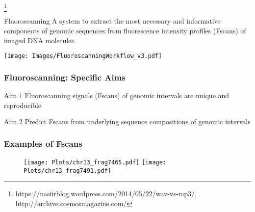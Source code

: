 \documentclass[10pt,dvipsnames,table]{beamer}
\begin{document}
\begin{frame}
\begin{columns}[t]
\begin{column}{0.5\textwidth}
\end{column}
\end{columns}
\vspace{-0.5cm}
{\tiny{\footnote{\tiny{https://nasiirblog.wordpress.com/2014/05/22/wav-vs-mp3/, http://archive.cosmosmagazine.com/}} }}
\end{frame}

\begin{frame}
\LARGE
\begin{block}{Fluoroscanning}
A system to extract the most necessary and informative components of genomic sequences from fluorescence intensity profiles (Fscans) of imaged DNA molecules. 
\end{block}
\end{frame}

\begin{frame}
\texttt{[image: Images/FluoroscanningWorkflow\_v3.pdf]}
\end{frame}

\begin{frame}
\frametitle{Fluoroscanning: Specific Aims}
\begin{block}{Aim 1}
Fluoroscanning signals (Fscans) of genomic intervals are unique and reproducible
\end{block}
\vspace{0.5in}
\begin{block}{Aim 2}
Predict Fscans from underlying sequence compositions of genomic intervals
\end{block}

\end{frame}

\begin{frame}
\frametitle{Examples of Fscans}
\begin{figure}[t]
\texttt{[image: Plots/chr13\_frag7465.pdf]}
\texttt{[image: Plots/chr13\_frag7491.pdf]}
\end{figure}
\end{frame}
\end{document}
